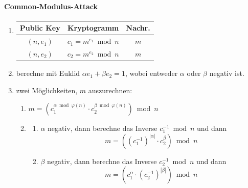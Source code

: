 \documentclass[8pt,a4paper,landscape]{article}
\begin{document}
\begin{multicols}{4}
\paragraph{Common-Modulus-Attack}
\begin{enumerate}[itemsep=1pt] 
    \item \begin{tabular}[t]{ccc}
                     Public Key & Kryptogramm & Nachr.\\
              \hline
              $(n, e_{1})$ & $c_{1} = m^{e_{1}} \bmod n$ & $m$ \\
              $(n, e_{2})$ & $c_{2} = m^{e_{2}} \bmod n$ & $m$ \\
              \hline
          \end{tabular}
    \item berechne mit Euklid $\alpha e_{1} + \beta e_{2} = 1$, wobei entweder $\alpha$
          oder $\beta$ negativ ist.
    \item zwei Möglichkeiten, $m$ auszurechnen:
          \begin{enumerate}
              \item 
              $m = \left( c_{1}^{\alpha \bmod \varphi(n)} \cdot 
                      c_{2}^{\beta \bmod \varphi(n)}
              \right) \bmod n$
              \item
                \begin{enumerate}
                    \item $\alpha$ negativ, dann berechne das Inverse
                            $c_{1}^{-1} \bmod n$ und dann
                            \[
                            m = 
                            \left( 
                                \left( c_{1}^{-1} \right)^{|\alpha|} 
                                \cdot
                                c_{2}^{\beta}
                            \right) \bmod n
                            \]
                    \item $\beta$ negativ, dann berechne das Inverse
                            $c_{2}^{-1} \bmod n$ und dann
                            \[
                            m = 
                            \left( 
                                c_{1}^{\alpha} 
                                \cdot
                                \left( c_{2}^{-1} \right)^{|\beta|} 
                            \right) \bmod n
                            \]
                \end{enumerate}
          \end{enumerate}
\end{enumerate}


\end{multicols}
\end{document}
